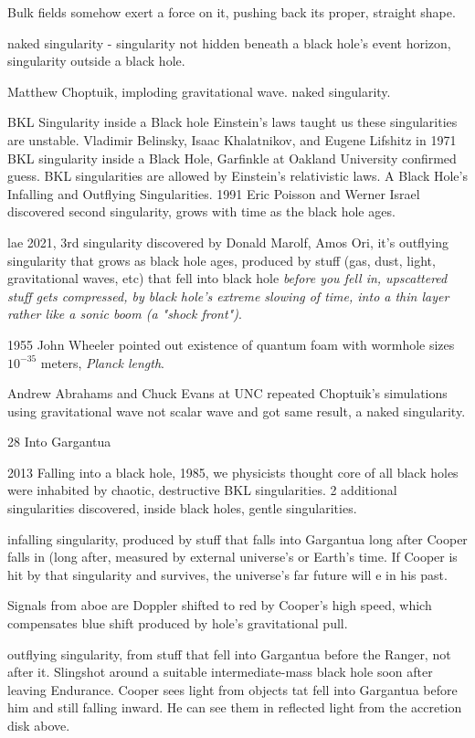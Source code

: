 \documentclass[10pt]{amsart}
\begin{document}
Bulk fields somehow exert a force on it, pushing back its proper, straight shape.

naked singularity - singularity not hidden beneath a black hole's event horizon, singularity outside a black hole.

Matthew Choptuik, imploding gravitational wave. naked singularity.

BKL Singularity inside a Black hole
Einstein's laws taught us these singularities are unstable. Vladimir Belinsky, Isaac Khalatnikov, and Eugene Lifshitz in 1971 BKL singularity inside a Black Hole, Garfinkle at Oakland University confirmed guess. 
BKL singularities are allowed by Einstein's relativistic laws.
A Black Hole's Infalling and Outflying Singularities.
1991 Eric Poisson and Werner Israel discovered second singularity, grows with time as the black hole ages.

lae 2021, 3rd singularity discovered by Donald Marolf, Amos Ori, it's outflying singularity that grows as black hole ages, produced by stuff (gas, dust, light, gravitational waves, etc) that fell into black hole \emph{before you fell in, upscattered stuff gets compressed, by black hole's extreme slowing of time, into a thin layer rather like a sonic boom (a "shock front")}.

1955 John Wheeler pointed out existence of quantum foam with wormhole sizes $10^{-35}$ meters, \emph{Planck length}.

Andrew Abrahams and Chuck Evans at UNC repeated Choptuik's simulations using gravitational wave not scalar wave and got same result, a naked singularity.

28 Into Gargantua

2013 Falling into a black hole, 1985, we physicists thought core of all black holes were inhabited by chaotic, destructive BKL singularities. 2 additional singularities discovered, inside black holes, gentle singularities.

infalling singularity, produced by stuff that falls into Gargantua long after Cooper falls in (long after, measured by external universe's or Earth's time. If Cooper is hit by that singularity and survives, the universe's far future will e in his past.

Signals from aboe are Doppler shifted to red by Cooper's high speed, which compensates blue shift produced by hole's gravitational pull.

outflying singularity, from stuff that fell into Gargantua before the Ranger, not after it. Slingshot around a suitable intermediate-mass black hole soon after leaving Endurance.
Cooper sees light from objects tat fell into Gargantua before him and still falling inward. He can see them in reflected light from the accretion disk above.
\end{document}
